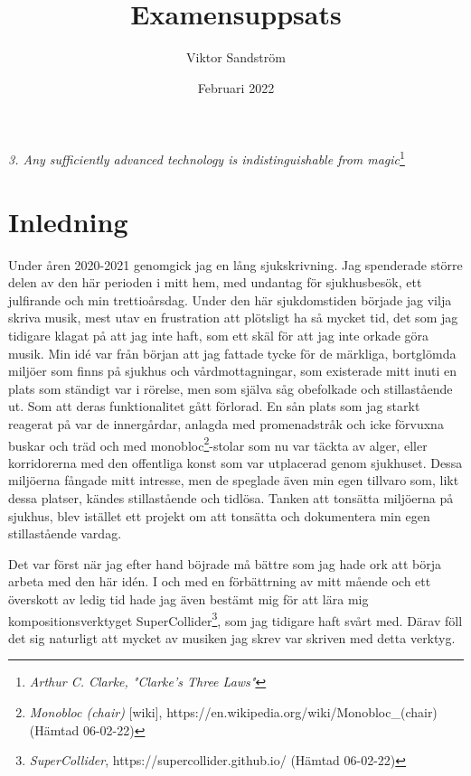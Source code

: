 \documentclass{article}
\begin{document}

\title{Examensuppsats}
\author{Viktor Sandström}
\date{Februari 2022}

\emph{
	3. Any sufficiently advanced technology is indistinguishable from magic}\footnote{\emph{Arthur C. Clarke,
"Clarke's Three Laws"}}

\section{Inledning}

Under åren 2020-2021 genomgick jag en lång sjukskrivning. Jag spenderade större delen av den här perioden i
mitt hem, med undantag för sjukhusbesök, ett julfirande och min trettioårsdag. Under den här sjukdomstiden
började jag vilja skriva musik, mest utav en frustration att plötsligt ha så mycket tid, det som jag tidigare
klagat på att jag inte haft, som ett skäl för att jag inte orkade göra musik. Min idé var från början att jag
fattade tycke för de märkliga, bortglömda miljöer som finns på sjukhus och vårdmottagningar, som existerade
mitt inuti en plats som ständigt var i rörelse, men som själva såg obefolkade och stillastående ut. Som att
deras funktionalitet gått förlorad. En sån plats som jag starkt reagerat på var de innergårdar, anlagda med
promenadstråk och icke förvuxna buskar och träd och med monobloc\footnote{\emph{Monobloc (chair)} [wiki],
https://en.wikipedia.org/wiki/Monobloc\_(chair) (Hämtad 06-02-22)}-stolar som nu var täckta av alger, eller 
korridorerna med den offentliga konst som var utplacerad genom sjukhuset. Dessa miljöerna fångade mitt
intresse, men de speglade även min egen tillvaro som, likt dessa platser, kändes stillastående och tidlösa.
Tanken att tonsätta miljöerna på sjukhus, blev istället ett projekt om att tonsätta och dokumentera min egen
stillastående vardag.

Det var först när jag efter hand böjrade må bättre som jag hade ork att börja arbeta med den här idén. I och 
med en förbättrning av mitt mående och ett överskott av ledig tid hade jag även bestämt mig för att lära mig
kompositionsverktyget SuperCollider\footnote{\emph{SuperCollider}, https://supercollider.github.io/ (Hämtad
06-02-22)}, som jag tidigare haft svårt med. Därav föll det sig naturligt att mycket av musiken jag skrev var
skriven med detta verktyg. 
\end{document}
